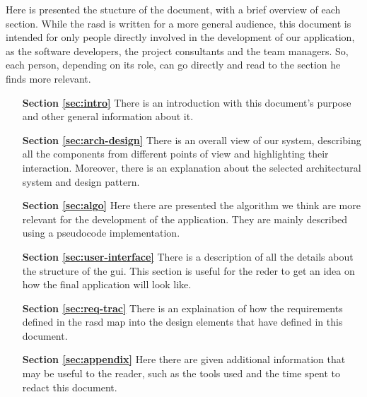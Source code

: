 Here is presented the stucture of the document,  with a brief overview of each section.
While the \acs{rasd} is written for a more general audience, this document is intended for only people directly involved in the development of our application, as the software developers, the project consultants and the team managers. 
So, each person, depending on its role, can go directly and read to the section he finds more relevant. 

\begin{itemize}

\item[\textbf{Section \ref{sec:intro}}]There is an introduction with this document's purpose and other general information about it.

\item[\textbf{Section \ref{sec:arch-design}}]There is an overall view of our system, describing all the components from different points of view and  highlighting their interaction. Moreover, there is an explanation about the selected architectural system and design pattern.

\item[\textbf{Section \ref{sec:algo}}]Here there are presented the algorithm we think are more relevant for the development of the application. They are mainly described using a pseudocode implementation.

\item[\textbf{Section \ref{sec:user-interface}}]There is a description of all the details about the structure of the \acl{gui}. This section is useful for the reder  to get an idea on how the final application will look like.

\item[\textbf{Section \ref{sec:req-trac}}]There is an explaination of how the requirements defined in the \acs{rasd} map into the design elements that have defined in this document.

\item[\textbf{Section \ref{sec:appendix}}]Here there are given additional information that may be useful to the reader, such as the tools used and the time spent to redact this document.
\end{itemize}

